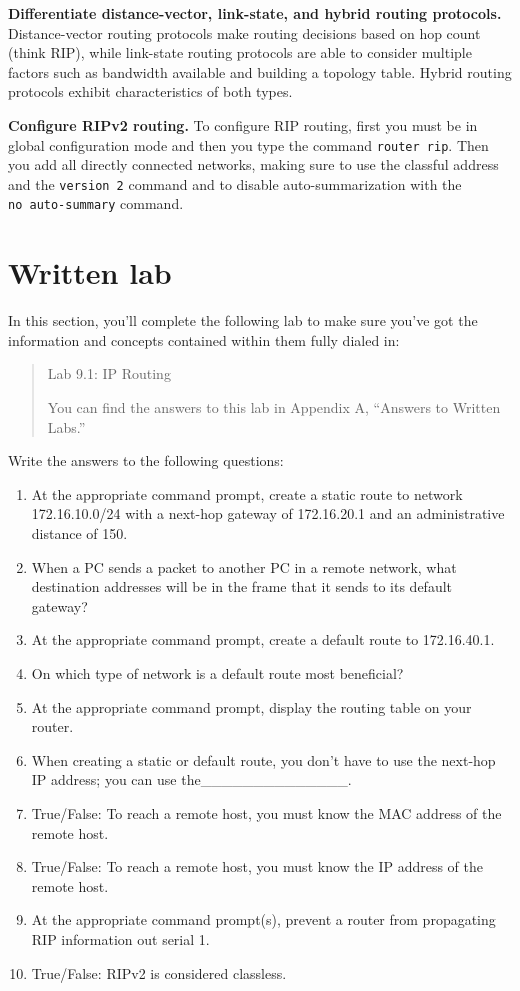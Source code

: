 \textbf{Differentiate distance-vector, link-state, and hybrid routing
protocols.} Distance-vector routing protocols make routing decisions
based on hop count (think RIP), while link-state routing protocols are
able to consider multiple factors such as bandwidth available and
building a topology table. Hybrid routing protocols exhibit
characteristics of both types.

\textbf{Configure RIPv2 routing.} To configure RIP routing, first you
must be in global configuration mode and then you type the command
\texttt{router\ rip}. Then you add all directly connected networks,
making sure to use the classful address and the \texttt{version\ 2}
command and to disable auto-summarization with the
\texttt{no\ auto-summary} command.



\section{Written lab}

In this section, you'll complete the following lab to make sure you've
got the information and concepts contained within them fully dialed in:

\begin{quote}
Lab 9.1: IP Routing

You can find the answers to this lab in Appendix A, ``Answers to Written
Labs.''
\end{quote}

Write the answers to the following questions:

\begin{enumerate}
\item
  At the appropriate command prompt, create a static route to network
  172.16.10.0/24 with a next-hop gateway of 172.16.20.1 and an
  administrative distance of 150.
\item
  When a PC sends a packet to another PC in a remote network, what
  destination addresses will be in the frame that it sends to its
  default gateway?
\item
  At the appropriate command prompt, create a default route to
  172.16.40.1.
\item
  On which type of network is a default route most beneficial?
\item
  At the appropriate command prompt, display the routing table on your
  router.
\item
  When creating a static or default route, you don't have to use the
  next-hop IP address; you can use the\_\_\_\_\_\_\_\_\_\_\_\_\_\_.
\item
  True/False: To reach a remote host, you must know the MAC address of
  the remote host.
\item
  \protect\hypertarget{c09.xhtmlux5cux23Page_401}{}{}True/False: To
  reach a remote host, you must know the IP address of the remote host.
\item
  At the appropriate command prompt(s), prevent a router from
  propagating RIP information out serial 1.
\item
  True/False: RIPv2 is considered classless.
\end{enumerate}




